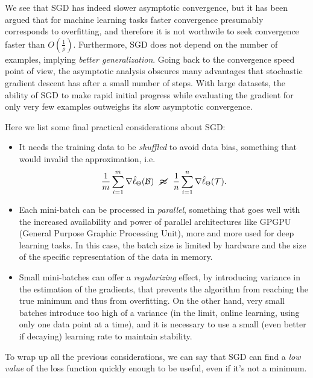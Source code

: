 We see that SGD has indeed slower asymptotic convergence, but it has been argued that for machine learning tasks faster convergence presumably corresponds to overfitting, and therefore it is not worthwile to seek convergence faster than $O(\frac{1}{\rho})$. Furthermore, SGD does not depend on the number of examples, implying \emph{better generalization}. Going back to the convergence speed point of view, the asymptotic analysis obscures many advantages that stochastic gradient descent has after a small number of steps. With large datasets, the ability of SGD to make rapid initial progress while evaluating the gradient for only very few examples outweighs its slow asymptotic convergence. 

Here we list some final practical considerations about SGD:
\begin{itemize}

    \item It needs the training data to be \emph{shuffled} to avoid data bias, something that would invalid the approximation, i.e.
    \[
        \frac{1}{m}\sum_{i=1}^m \nabla\hat{\ell}_\Theta(\mathcal{B}) ~~ \bm{\cancel{\approx}} ~~ \frac{1}{n}\sum_{i=1}^n \nabla \hat{\ell}_\Theta  ( \mathcal{T}).
    \]
    
    \item Each mini-batch can be processed in \emph{parallel}, something that goes well with the increased availability and power of parallel architectures like GPGPU (General Purpose Graphic Processing Unit), more and more used for deep learning tasks. In this case, the batch size is limited by hardware and the size of the specific representation of the data in memory.
    
    \item Small mini-batches can offer a \emph{regularizing} effect, by introducing variance in the estimation of the gradients, that prevents the algorithm from reaching the true minimum and thus from overfitting. On the other hand, very small batches introduce too high of a variance (in the limit, online learning, using only one data point at a time), and it is necessary to use a small (even better if decaying) learning rate to maintain stability.
    
\end{itemize}
    
To wrap up all the previous considerations, we can say that SGD can find a \textit{low value} of the loss function quickly enough to be useful, even if it's not a minimum.
